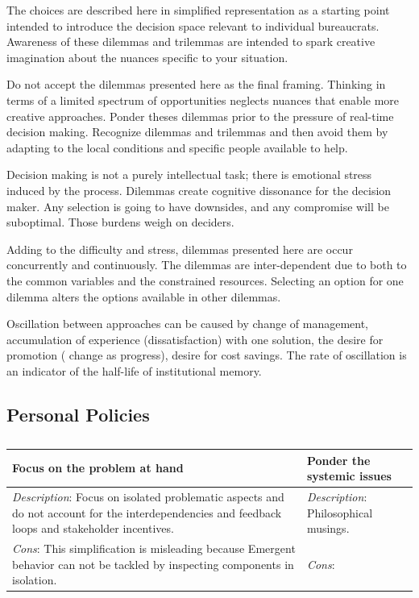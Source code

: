 The choices are described here in simplified representation as a starting point intended to introduce the decision space relevant to individual bureaucrats. Awareness of these dilemmas and trilemmas are intended to spark creative imagination about the nuances specific to your situation.

Do not accept the dilemmas presented here as the final framing. Thinking in terms of a limited spectrum of opportunities neglects nuances that enable more creative approaches. Ponder theses dilemmas prior to the pressure of real-time decision making.  Recognize dilemmas and trilemmas and then avoid them by adapting to the local conditions and specific people available to help.


Decision making is not a purely intellectual task; there is emotional stress induced by the process. Dilemmas create cognitive dissonance for the decision maker. Any selection is going to have downsides, and any compromise will be suboptimal. Those burdens weigh on deciders.

Adding to the difficulty and stress, dilemmas presented here are occur concurrently and continuously. The dilemmas are inter-dependent due to both to the common variables and the constrained resources.
Selecting an option for one dilemma alters the options available in other dilemmas.

Oscillation between approaches can be caused by change of management, accumulation of experience (dissatisfaction) with one solution, the desire for promotion ( change as progress), desire for cost savings. The rate of oscillation is an indicator of the half-life of institutional memory. 



\subsection{Personal Policies}

\begin{center}
\begin{table}[ht]
\begin{tabular}{ | m{\dilemmatablewidth}| m{\dilemmatablewidth} | } 
  \hline
  \textbf{Focus on the problem at hand} &
  \textbf{Ponder the systemic issues} \\
  \hline
  \textit{Description}: Focus on isolated problematic aspects and do not account for the interdependencies and feedback loops and stakeholder incentives. &
  \textit{Description}: Philosophical musings. \\
  \hline
  \textit{Cons}: This simplification is misleading because Emergent behavior can not be tackled by inspecting components in isolation. & 
  \textit{Cons}: \\
  \hline
\end{tabular}
\caption{
}
\label{table:focus-vs-systemic}
\end{table}
\end{center}

